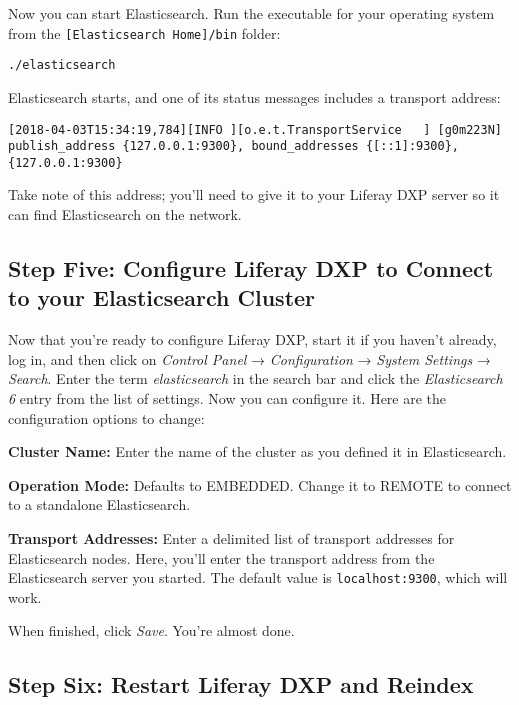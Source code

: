 Now you can start Elasticsearch. Run the executable for your operating
system from the \texttt{{[}Elasticsearch\ Home{]}/bin} folder:

\begin{verbatim}
./elasticsearch
\end{verbatim}

Elasticsearch starts, and one of its status messages includes a
transport address:

\begin{verbatim}
[2018-04-03T15:34:19,784][INFO ][o.e.t.TransportService   ] [g0m223N] publish_address {127.0.0.1:9300}, bound_addresses {[::1]:9300}, {127.0.0.1:9300}
\end{verbatim}

Take note of this address; you'll need to give it to your Liferay DXP
server so it can find Elasticsearch on the network.

\subsection{Step Five: Configure Liferay DXP to Connect to your
Elasticsearch
Cluster}\label{step-five-configure-liferay-dxp-to-connect-to-your-elasticsearch-cluster-1}

Now that you're ready to configure Liferay DXP, start it if you haven't
already, log in, and then click on \emph{Control Panel} →
\emph{Configuration} → \emph{System Settings} → \emph{Search}. Enter the
term \emph{elasticsearch} in the search bar and click the
\emph{Elasticsearch 6} entry from the list of settings. Now you can
configure it. Here are the configuration options to change:

\textbf{Cluster Name:} Enter the name of the cluster as you defined it
in Elasticsearch.

\textbf{Operation Mode:} Defaults to EMBEDDED. Change it to REMOTE to
connect to a standalone Elasticsearch.

\textbf{Transport Addresses:} Enter a delimited list of transport
addresses for Elasticsearch nodes. Here, you'll enter the transport
address from the Elasticsearch server you started. The default value is
\texttt{localhost:9300}, which will work.

When finished, click \emph{Save}. You're almost done.

\subsection{Step Six: Restart Liferay DXP and
Reindex}\label{step-six-restart-liferay-dxp-and-reindex-1}


